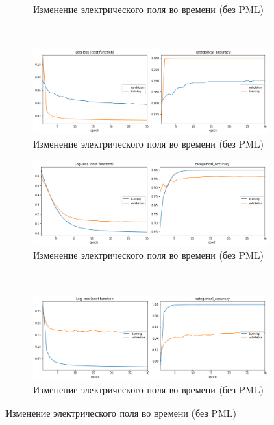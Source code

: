 \begin{figure}[p]
\begin{subfigure}[b]{0.485\textwidth}
                    \caption{Изменение электрического поля во времени (без PML)}
    \end{subfigure}
    ~
    \begin{subfigure}[b]{0.485\textwidth}
        \includegraphics[width=\textwidth]{include/graphics/experimental_plots/grayscale/mixed_koch}
                    \caption{Изменение электрического поля во времени (без PML)}
    \end{subfigure}
    
\bigskip
    \begin{subfigure}[b]{0.485\textwidth}
        \includegraphics[width=\textwidth]{include/graphics/experimental_plots/grayscale/french_wow}
                    \caption{Изменение электрического поля во времени (без PML)}
    \end{subfigure}
    ~
    \begin{subfigure}[b]{0.485\textwidth}
        \includegraphics[width=\textwidth]{include/graphics/experimental_plots/grayscale/mixed_wow}
            \caption{Изменение электрического поля во времени (без PML)}
    \end{subfigure}

    \caption{Изменение электрического поля во времени (без PML)}\label{fig:EzPmlOff}
\end{figure}

